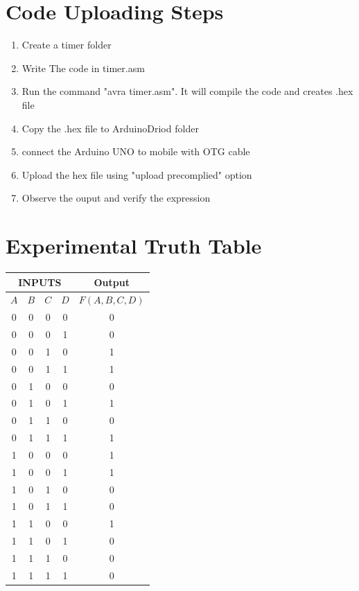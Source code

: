 \documentclass[a4paper,12pt]{article}
\begin{document}
\section*{Code Uploading Steps}
\begin{enumerate}
        \item Create a timer folder
        \item Write The code in timer.asm
        \item Run the command "avra timer.asm". It will compile the code and creates .hex file
        \item Copy the .hex file to ArduinoDriod folder
        \item connect the Arduino UNO to mobile with OTG cable
        \item Upload the hex file using "upload precomplied" option
        \item Observe the ouput and verify the expression
\end{enumerate}
\section*{Experimental Truth Table}
\begin{center}
\begin{tabular}{|c|c|c|c|c|}
\hline
\multicolumn{4}{|c|}{\textbf{INPUTS}} & \textbf{Output} \\
\hline
$A$ & $B$ & $C$ & $D$ & $F(A,B,C,D)$ \\
\hline
0 & 0 & 0 & 0 & 0 \\ 
0 & 0 & 0 & 1 & 0 \\ 
0 & 0 & 1 & 0 & 1 \\ 
0 & 0 & 1 & 1 & 1 \\ 
0 & 1 & 0 & 0 & 0 \\ 
0 & 1 & 0 & 1 & 1 \\ 
0 & 1 & 1 & 0 & 0 \\ 
0 & 1 & 1 & 1 & 1 \\ 
1 & 0 & 0 & 0 & 1 \\ 
1 & 0 & 0 & 1 & 1 \\ 
1 & 0 & 1 & 0 & 0 \\ 
1 & 0 & 1 & 1 & 0 \\ 
1 & 1 & 0 & 0 & 1 \\ 
1 & 1 & 0 & 1 & 0 \\ 
1 & 1 & 1 & 0 & 0 \\ 
1 & 1 & 1 & 1 & 0 \\ 
\hline
\end{tabular}
\end{center}
\end{document}
